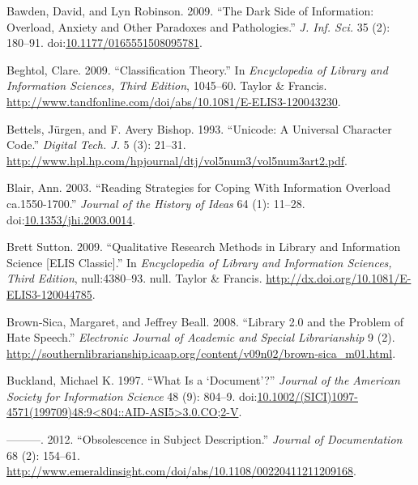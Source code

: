 \documentclass[]{article}
\begin{document}
\hypertarget{ref-bawdenux5fdarkux5f2009}{}
Bawden, David, and Lyn Robinson. 2009. ``The Dark Side of Information:
Overload, Anxiety and Other Paradoxes and Pathologies.'' \emph{J. Inf.
Sci.} 35 (2): 180--91.
doi:\href{https://doi.org/10.1177/0165551508095781}{10.1177/0165551508095781}.

\hypertarget{ref-beghtolux5fclassificationux5f2009}{}
Beghtol, Clare. 2009. ``Classification Theory.'' In \emph{Encyclopedia
of Library and Information Sciences, Third Edition}, 1045--60. Taylor \&
Francis.
\url{http://www.tandfonline.com/doi/abs/10.1081/E-ELIS3-120043230}.

\hypertarget{ref-bettelsux5funicode:ux5f1993}{}
Bettels, Jürgen, and F. Avery Bishop. 1993. ``Unicode: A Universal
Character Code.'' \emph{Digital Tech. J.} 5 (3): 21--31.
\url{http://www.hpl.hp.com/hpjournal/dtj/vol5num3/vol5num3art2.pdf}.

\hypertarget{ref-blairux5freadingux5f2003}{}
Blair, Ann. 2003. ``Reading Strategies for Coping With Information
Overload ca.1550-1700.'' \emph{Journal of the History of Ideas} 64 (1):
11--28.
doi:\href{https://doi.org/10.1353/jhi.2003.0014}{10.1353/jhi.2003.0014}.

\hypertarget{ref-brettux5fsuttonux5fqualitativeux5f2009}{}
Brett Sutton. 2009. ``Qualitative Research Methods in Library and
Information Science {[}ELIS Classic{]}.'' In \emph{Encyclopedia of
Library and Information Sciences, Third Edition}, null:4380--93. null.
Taylor \& Francis. \url{http://dx.doi.org/10.1081/E-ELIS3-120044785}.

\hypertarget{ref-brown-sicaux5flibraryux5f2008}{}
Brown-Sica, Margaret, and Jeffrey Beall. 2008. ``Library 2.0 and the
Problem of Hate Speech.'' \emph{Electronic Journal of Academic and
Special Librarianship} 9 (2).
\url{http://southernlibrarianship.icaap.org/content/v09n02/brown-sica_m01.html}.

\hypertarget{ref-bucklandux5fwhatux5f1997}{}
Buckland, Michael K. 1997. ``What Is a `Document'?'' \emph{Journal of
the American Society for Information Science} 48 (9): 804--9.
doi:\href{https://doi.org/10.1002/(SICI)1097-4571(199709)48:9\%3C804::AID-ASI5\%3E3.0.CO;2-V}{10.1002/(SICI)1097-4571(199709)48:9\textless{}804::AID-ASI5\textgreater{}3.0.CO;2-V}.

\hypertarget{ref-bucklandux5fobsolescenceux5f2012}{}
---------. 2012. ``Obsolescence in Subject Description.'' \emph{Journal
of Documentation} 68 (2): 154--61.
\url{http://www.emeraldinsight.com/doi/abs/10.1108/00220411211209168}.
\end{document}
